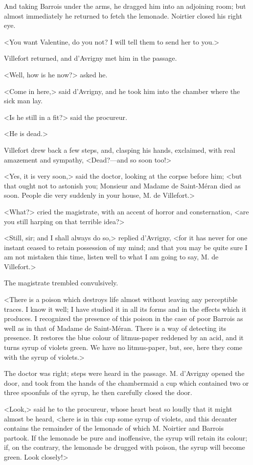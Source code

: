  And taking Barrois under the arms, he dragged him into an adjoining room; but almost immediately he returned to fetch the lemonade. Noirtier closed his right eye. 

 <You want Valentine, do you not? I will tell them to send her to you.> 

 Villefort returned, and d'Avrigny met him in the passage. 

 <Well, how is he now?> asked he. 

 <Come in here,> said d'Avrigny, and he took him into the chamber where the sick man lay. 

 <Is he still in a fit?> said the procureur. 

 <He is dead.> 

 Villefort drew back a few steps, and, clasping his hands, exclaimed, with real amazement and sympathy, <Dead?—and so soon too!> 

 <Yes, it is very soon,> said the doctor, looking at the corpse before him; <but that ought not to astonish you; Monsieur and Madame de Saint-Méran died as soon. People die very suddenly in your house, M. de Villefort.> 

 <What?> cried the magistrate, with an accent of horror and consternation, <are you still harping on that terrible idea?> 

 <Still, sir; and I shall always do so,> replied d'Avrigny, <for it has never for one instant ceased to retain possession of my mind; and that you may be quite sure I am not mistaken this time, listen well to what I am going to say, M. de Villefort.> 

 The magistrate trembled convulsively. 

 <There is a poison which destroys life almost without leaving any perceptible traces. I know it well; I have studied it in all its forms and in the effects which it produces. I recognized the presence of this poison in the case of poor Barrois as well as in that of Madame de Saint-Méran. There is a way of detecting its presence. It restores the blue colour of litmus-paper reddened by an acid, and it turns syrup of violets green. We have no litmus-paper, but, see, here they come with the syrup of violets.> 

 The doctor was right; steps were heard in the passage. M. d'Avrigny opened the door, and took from the hands of the chambermaid a cup which contained two or three spoonfuls of the syrup, he then carefully closed the door. 

 <Look,> said he to the procureur, whose heart beat so loudly that it might almost be heard, <here is in this cup some syrup of violets, and this decanter contains the remainder of the lemonade of which M. Noirtier and Barrois partook. If the lemonade be pure and inoffensive, the syrup will retain its colour; if, on the contrary, the lemonade be drugged with poison, the syrup will become green. Look closely!> 

